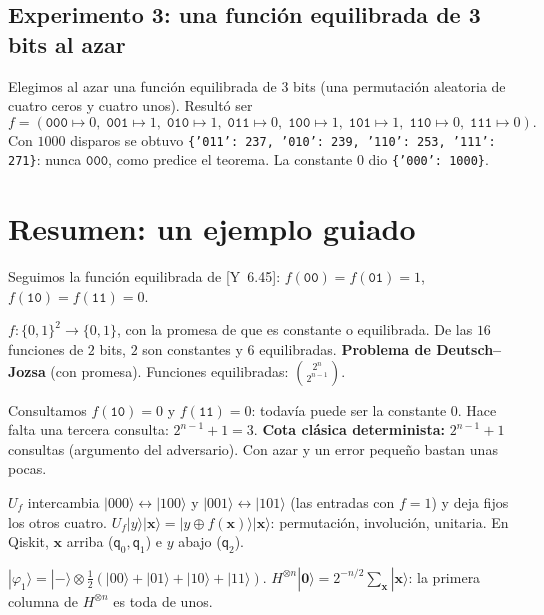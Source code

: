 \documentclass[11pt, a4paper, twoside, openright]{report}
\newcommand{\pasoguiado}[3]{%
\begin{tcolorbox}[colback=gray!6!white,colframe=gray!55!black,title={#1}]
#2
\tcblower
\small #3
\end{tcolorbox}}
\providecommand{\ket}[1]{|#1\rangle}
\newcommand{\bx}{\mathbf{x}}
\newcommand{\bcero}{\mathbf{0}}
\newcommand{\bits}[1]{\{0,1\}^{#1}}
\newcommand{\Yan}[1]{\textcolor{rosaviejo}{\small[Y~#1]}}  %
\begin{document}
\subsection{Experimento 3: una función equilibrada de 3 bits al azar}

\noindent Elegimos al azar una función equilibrada de $3$ bits (una permutación aleatoria de cuatro ceros y cuatro unos). Resultó ser
\[ f = (\texttt{000}\mapsto0,\; \texttt{001}\mapsto1,\; \texttt{010}\mapsto1,\; \texttt{011}\mapsto0,\; \texttt{100}\mapsto1,\; \texttt{101}\mapsto1,\; \texttt{110}\mapsto0,\; \texttt{111}\mapsto0). \]
Con $1000$ disparos se obtuvo \texttt{\{'011': 237, '010': 239, '110': 253, '111': 271\}}: nunca $\texttt{000}$, como predice el teorema. La constante $0$ dio \texttt{\{'000': 1000\}}.

\cleardoublepage
\section{Resumen: un ejemplo guiado}

\noindent Seguimos la función equilibrada de \Yan{6.45}: $f(\texttt{00}) = f(\texttt{01}) = 1$, $f(\texttt{10}) = f(\texttt{11}) = 0$.

\pasoguiado{Paso 1. El problema}
{$f:\bits{2}\to\{0,1\}$, con la promesa de que es constante o equilibrada. De las $16$ funciones de $2$ bits, $2$ son constantes y $6$ equilibradas.}
{\textbf{Problema de Deutsch--Jozsa} (con promesa). Funciones equilibradas: $\binom{2^n}{2^{n-1}}$.}

\pasoguiado{Paso 2. Clásicamente}
{Consultamos $f(\texttt{10}) = 0$ y $f(\texttt{11}) = 0$: todavía puede ser la constante $0$. Hace falta una tercera consulta: $2^{n-1}+1 = 3$.}
{\textbf{Cota clásica determinista:} $2^{n-1}+1$ consultas (argumento del adversario). Con azar y un error pequeño bastan unas pocas.}

\pasoguiado{Paso 3. El oráculo}
{$U_f$ intercambia $\ket{000}\leftrightarrow\ket{100}$ y $\ket{001}\leftrightarrow\ket{101}$ (las entradas con $f = 1$) y deja fijos los otros cuatro.}
{$U_f\ket{y}\ket{\bx} = \ket{y\oplus f(\bx)}\ket{\bx}$: permutación, involución, unitaria. En Qiskit, $\bx$ arriba ($\mathsf{q}_0, \mathsf{q}_1$) e $y$ abajo ($\mathsf{q}_2$).}

\pasoguiado{Paso 4. Superposición uniforme}
{$\ket{\varphi_1} = \ket{-}\otimes\tfrac12(\ket{00}+\ket{01}+\ket{10}+\ket{11})$.}
{$H^{\otimes n}\ket{\bcero} = 2^{-n/2}\sum_{\bx}\ket{\bx}$: la primera columna de $H^{\otimes n}$ es toda de unos.}
\end{document}
